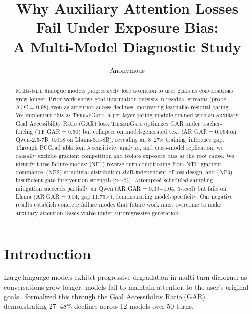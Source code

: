 \documentclass[11pt]{article}
\title{Why Auxiliary Attention Losses Fail Under Exposure Bias:\\A Multi-Model Diagnostic Study}
\author{Anonymous}
\date{}
\newcommand{\gar}{\textsc{GAR}}
\newcommand{\tg}{\textsc{ThreadGate}}
\begin{document}
\maketitle

\begin{abstract}
Multi-turn dialogue models progressively lose attention to user goals as conversations grow longer. Prior work shows goal information persists in residual streams (probe AUC$=$0.98) even as attention access declines, motivating learnable residual gating. We implement this as \tg{}, a per-layer gating module trained with an auxiliary Goal Accessibility Ratio (\gar{}) loss. \tg{} optimizes \gar{} under teacher-forcing (TF \gar{}$=$0.50) but collapses on model-generated text (AR \gar{}$=$0.064 on Qwen-2.5-7B, 0.018 on Llama-3.1-8B), revealing an 8--27$\times$ training--inference gap. Through PCGrad ablation, $\lambda$ sensitivity analysis, and cross-model replication, we causally exclude gradient competition and isolate exposure bias as the root cause. We identify three failure modes: (NF1) reverse turn conditioning from NTP gradient dominance, (NF2) structural distribution shift independent of loss design, and (NF3) insufficient gate intervention strength (2--7\%). Attempted scheduled sampling mitigation succeeds partially on Qwen (AR \gar{}$=$0.39$\pm$0.04, 3-seed) but fails on Llama (AR \gar{}$=$0.04, gap 11.75$\times$), demonstrating model-specificity. Our negative results establish concrete failure modes that future work must overcome to make auxiliary attention losses viable under autoregressive generation.
\end{abstract}

\section{Introduction}

Large language models exhibit progressive degradation in multi-turn dialogue: as conversations grow longer, models fail to maintain attention to the user's original goals \citep{dongre2026goal,liu2024lost,hsieh2024ruler}. \citet{dongre2026goal} formalized this through the Goal Accessibility Ratio (\gar{}), demonstrating 27--48\% declines across 12 models over 50 turns.
\end{document}
